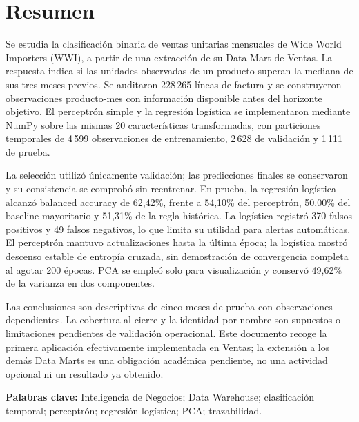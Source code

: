 \section*{Resumen}
Se estudia la clasificación binaria de ventas unitarias mensuales de Wide World Importers (WWI), a partir de una extracción de su Data Mart de Ventas. La respuesta indica si las unidades observadas de un producto superan la mediana de sus tres meses previos. Se auditaron 228\,265 líneas de factura y se construyeron observaciones producto-mes con información disponible antes del horizonte objetivo. El perceptrón simple y la regresión logística se implementaron mediante NumPy sobre las mismas 20 características transformadas, con particiones temporales de 4\,599 observaciones de entrenamiento, 2\,628 de validación y 1\,111 de prueba.

La selección utilizó únicamente validación; las predicciones finales se conservaron y su consistencia se comprobó sin reentrenar. En prueba, la regresión logística alcanzó balanced accuracy de 62,42\%, frente a 54,10\% del perceptrón, 50,00\% del baseline mayoritario y 51,31\% de la regla histórica. La logística registró 370 falsos positivos y 49 falsos negativos, lo que limita su utilidad para alertas automáticas. El perceptrón mantuvo actualizaciones hasta la última época; la logística mostró descenso estable de entropía cruzada, sin demostración de convergencia completa al agotar 200 épocas. PCA se empleó solo para visualización y conservó 49,62\% de la varianza en dos componentes.

Las conclusiones son descriptivas de cinco meses de prueba con observaciones dependientes. La cobertura al cierre y la identidad por nombre son supuestos o limitaciones pendientes de validación operacional. Este documento recoge la primera aplicación efectivamente implementada en Ventas; la extensión a los demás Data Marts es una obligación académica pendiente, no una actividad opcional ni un resultado ya obtenido.

\noindent\textbf{Palabras clave:} Inteligencia de Negocios; Data Warehouse; clasificación temporal; perceptrón; regresión logística; PCA; trazabilidad.
